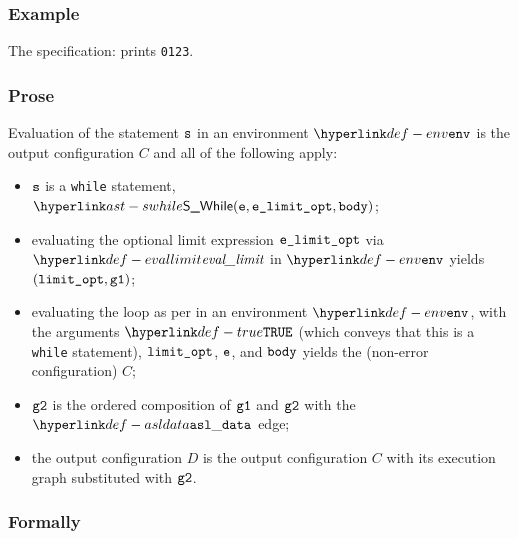 \subsubsection{Example}
The specification:
prints \texttt{0123}.

\subsubsection{Prose}
Evaluation of the statement $\vs$ in an environment $\env$ is
the output configuration $C$ and all of the following apply:
\begin{itemize}
  \item $\vs$ is a \texttt{while} statement, $\SWhile(\ve, \velimitopt, \vbody)$;
  \item evaluating the optional limit expression $\velimitopt$ via $\evallimit$ in $\env$
        yields $(\vlimitopt, \vgone)$\ProseOrError;
  \item evaluating the loop as per  in an environment $\env$,
  with the arguments $\True$ (which conveys that this is a \texttt{while} statement), $\vlimitopt$, $\ve$, and $\vbody$
  yields the (non-error configuration) $C$\ProseOrError;
  \item $\vgtwo$ is the ordered composition of $\vgone$ and $\vgtwo$ with the $\asldata$ edge;
  \item the output configuration $D$ is the output configuration $C$ with its execution graph
        substituted with $\vgtwo$.
\end{itemize}
\subsubsection{Formally}
\begin{mathpar}
\end{mathpar}

